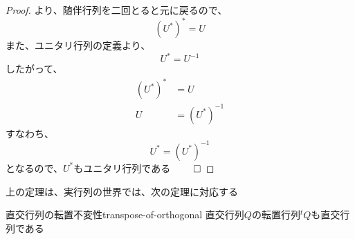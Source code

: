 \documentclass[../../../topic_linear-algebra]{subfiles}
\begin{document}
\begin{proof}
  より、随伴行列を二回とると元に戻るので、
  \begin{equation*}
    (U^*)^* = U
  \end{equation*}
  また、ユニタリ行列の定義より、
  \begin{equation*}
    U^* = U^{-1}
  \end{equation*}
  したがって、
  \begin{align*}
    (U^*)^* & = U          \\
    U       & = (U^*)^{-1}
  \end{align*}
  すなわち、
  \begin{equation*}
    U^* = (U^*)^{-1}
  \end{equation*}
  となるので、$U^*$もユニタリ行列である $\qed$
\end{proof}

\br

上の定理は、実行列の世界では、次の定理に対応する

\begin{theorem}{直交行列の転置不変性}{transpose-of-orthogonal}
  直交行列$Q$の転置行列${}^tQ$も直交行列である
\end{theorem}
\end{document}
